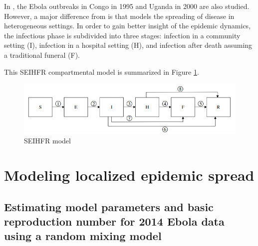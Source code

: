 \documentclass[10pt, journal,onecolumn]{IEEEtran}
\begin{document}
\label{SubSec:SEIHFR}

In \citep{legrand2007understanding}, the Ebola outbreaks in Congo in 1995 and Uganda in 2000
are also studied. However, a major difference from
\citep{chowell2004basic} is that \citep{legrand2007understanding} models the spreading of disease
in heterogeneous settings. In order to gain better insight of the epidemic dynamics,
the infectious phase is subdivided into three stages:
infection in a community setting (I), infection in a hospital setting (H), and
infection after death assuming a traditional funeral (F).

This SEIHFR compartmental model is summarized in Figure \ref{fig:SEIHFR_model}.

\begin{figure}[h!]
\centering
\includegraphics[scale=0.5]{seihfr_model_fig}
\caption{SEIHFR model}
\label{fig:SEIHFR_model}
\end{figure}




\section{Modeling localized epidemic spread}
\label{sec:IntraCountry}





\subsection*{\textbf{Estimating model parameters and basic reproduction number for 2014 Ebola data using a random mixing model}}
\end{document}
